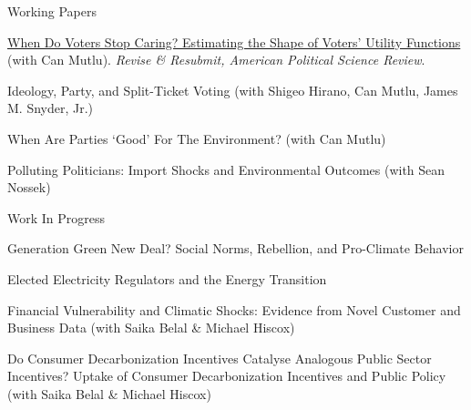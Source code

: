 \documentclass{resume}
\begin{document}
\newpage

\begin{rSection}{\Large W\MakeLowercase{orking} P\MakeLowercase{apers}} \itemsep -3pt {}
\vspace{-0.7cm}


\item \href{https://arxiv.org/abs/2501.03196}{When Do Voters Stop Caring? Estimating the Shape of Voters' Utility Functions} (with Can Mutlu). \textit{Revise \& Resubmit, American Political Science Review}.

\medskip

\item Ideology, Party, and Split-Ticket Voting (with Shigeo Hirano, Can Mutlu, James M. Snyder, Jr.)

\medskip 

\item When Are Parties `Good' For The Environment?  (with Can Mutlu)


\medskip

\item Polluting Politicians: Import Shocks and Environmental Outcomes (with Sean Nossek)

\end{rSection}

\bigskip


\begin{rSection}{\Large W\MakeLowercase{ork} I\MakeLowercase{n} P\MakeLowercase{rogress}} \itemsep -2pt {}
\vspace{-0.7cm}


\item Generation Green New Deal? Social Norms, Rebellion, and Pro-Climate Behavior

\medskip

\item Elected Electricity Regulators and the
Energy Transition

\medskip


\item Financial Vulnerability and Climatic Shocks: Evidence from Novel Customer and Business Data (with Saika Belal \& Michael Hiscox)

\medskip
\item Do Consumer Decarbonization Incentives Catalyse Analogous Public Sector Incentives? Uptake of Consumer Decarbonization Incentives and Public Policy (with Saika Belal \& Michael Hiscox)

\end{rSection}
\end{document}
